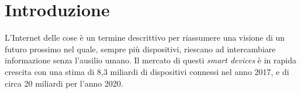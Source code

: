 \chapter*{Introduzione}
L'Internet delle cose è un termine descrittivo per riassumere una visione di
un futuro prossimo nel quale, sempre più dispositivi, riescano ad intercambiare
informazione senza l'ausilio umano. Il mercato di questi \emph{smart devices } è
in rapida crescita con una stima di 8,3 miliardi di dispositivi connessi nel
anno 2017, e di circa 20 miliardi per l'anno 2020.
